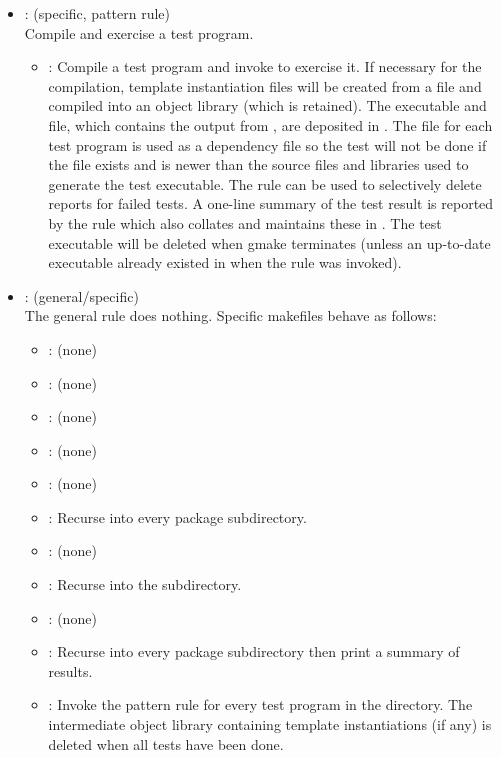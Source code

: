 \begin{itemize}
\item
    : (specific, pattern rule)
   \\ Compile and exercise a test program.
   \begin{itemize}
   \item
      : Compile a test program and invoke  to exercise
      it.  If necessary for the compilation, template instantiation files will
      be created from a  file and compiled into an object
      library (which is retained).  The executable and  file,
      which contains the output from , are deposited in
      .  The  file for each test program is
      used as a dependency file so the test will not be done if the
       file exists and is newer than the source files and
      libraries used to generate the test executable.  The 
      rule can be used to selectively delete reports for failed tests.  A
      one-line summary of the test result is reported by the rule which also
      collates and maintains these in .
      The test executable will be deleted when gmake terminates (unless an
      up-to-date executable already existed in  when the
      rule was invoked).
   \end{itemize}

\item
    : (general/specific)
   \\ The general rule does nothing.  Specific makefiles behave as follows:
   \begin{itemize}
   \item
      : (none)
   \item
      : (none)
   \item
      : (none)
   \item
      : (none)
   \item
      : (none)
   \item
      : Recurse into every package subdirectory.
   \item
      : (none)
   \item
      : Recurse into the  subdirectory.
   \item
      : (none)
   \item
      : Recurse into every package subdirectory then print a summary
      of results.
   \item
      : Invoke the  pattern rule for every test
      program in the directory.  The intermediate object library containing
      template instantiations (if any) is deleted when all tests have been
      done.
   \end{itemize}
\end{itemize}


